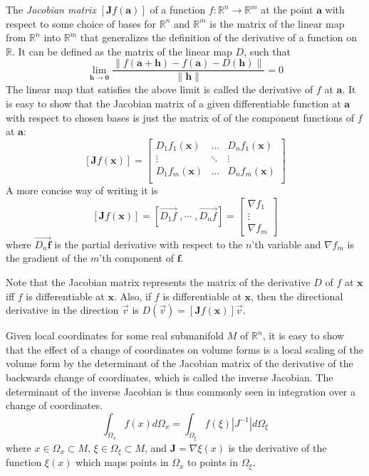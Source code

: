 \documentclass[12pt]{article}
\begin{document}
\newcommand{\pt}{\mathbf}
\newcommand{\R}{\mathbb{R}}

The \emph{Jacobian matrix} $[\mathbf{J}f(\pt{a})]$ of a function $f\colon\R^n\rightarrow\R^m$ at the point $\pt{a}$ with respect to some choice of bases for $\R^n$ and $\R^m$ is the matrix of the linear map from $\R^n$ into $\R^m$ that generalizes the definition of the derivative of a function on $\R$. It can be defined as the matrix of the linear map $D$, such that 
$$\lim_{\pt{h}\rightarrow\pt{0}}\frac{\|f(\pt{a + h}) - f(\pt{a}) - D(\pt{h})\|}{\|\pt{h}\|} = 0$$
The linear map that satisfies the above limit is called the derivative of $f$ at $\pt{a}$. It is easy to show that the Jacobian matrix of a given differentiable function at $\pt{a}$ with respect to chosen bases is just the matrix of  of the component functions of $f$ at $\pt{a}$:
$$[\mathbf{J}f(\pt{x})]=\left[\begin{array}{ccc}
D_1f_1(\pt{x}) & \dots & D_nf_1(\pt{x})\\
\vdots & \ddots & \vdots\\
D_1f_m(\pt{x}) & \dots & D_nf_m(\pt{x})\\
\end{array}\right]$$
A more concise way of writing it is
$$[\mathbf{J}f(\pt{x})]=[\overrightarrow{D_1 f}\;,\cdots\;, \overrightarrow{D_n f}]=\left[\begin{array}{c}\nabla f_1\\ \vdots\\ \nabla f_m\end{array}\right]$$
where $\overrightarrow{D_n\pt{f}}$ is the partial derivative with respect to the $n$'th variable and $\nabla f_m$ is the gradient of the $m$'th component of $\mathbf{f}$. 

Note that the Jacobian matrix represents the matrix of the derivative $D$ of $f$ at $\pt{x}$ iff $f$ is differentiable at $\pt{x}$. Also, if $f$ is differentiable at $\pt{x}$, then the directional derivative in the direction $\vec{v}$ is $D(\vec{v}) = [\mathbf{J}f(\pt{x})]\vec{v}$.

Given local coordinates for some real submanifold $M$ of $\R^n$, it is easy to show that the effect of a change of coordinates on volume forms is a local scaling of the volume form by the determinant of the Jacobian matrix of the derivative of the backwards change of coordinates, which is called the inverse Jacobian. The determinant of the inverse Jacobian is thus commonly seen in integration over a change of coordinates.
$$\int_{\Omega_x} f(x) d\Omega_x = \int_{\Omega_\xi} f(\xi) |J^{-1}| d\Omega_\xi$$
where $x \in \Omega_x \subset M$, $\xi \in \Omega_\xi \subset M$, and $\mathbf{J} = \nabla \xi(x)$ is the derivative of the function $\xi(x)$ which maps points in $\Omega_x$ to points in $\Omega_\xi$.
\end{document}

